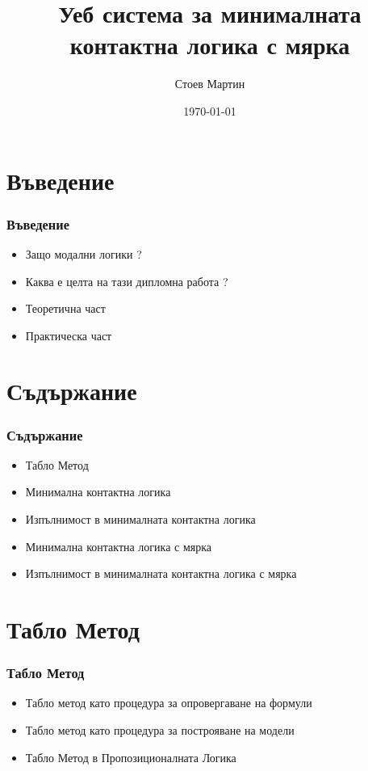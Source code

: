 \documentclass{beamer}
\begin{document}
\title{Уеб система за минималната контактна логика с мярка}  
\author{Стоев Мартин}
\date{\today} 
\begin{frame}
\titlepage
\end{frame}



\section{Въведение} 
\begin{frame}\frametitle{Въведение}
\begin{itemize}
	\item Защо модални логики ?
	\item Каква е целта на тази дипломна работа ?
	\item Теоретична част
	\item Практическа част
\end{itemize}
\end{frame}

\section{Съдържание} 
\begin{frame}\frametitle{Съдържание}
\begin{itemize}
	\item Табло Метод
	\item Минимална контактна логика
	\item Изпълнимост в минималната контактна логика
	\item Минимална контактна логика с мярка
	\item Изпълнимост в минималната контактна логика с мярка
\end{itemize}
\end{frame}

\section{Табло Метод}
\begin{frame}\frametitle{Табло Метод}
\begin{itemize}
	\item Табло метод като процедура за опровергаване на формули
	\item Табло метод като процедура за построяване на модели
	\item Табло Метод в Пропозиционалната Логика
\end{itemize}
\end{frame}
\end{document}
